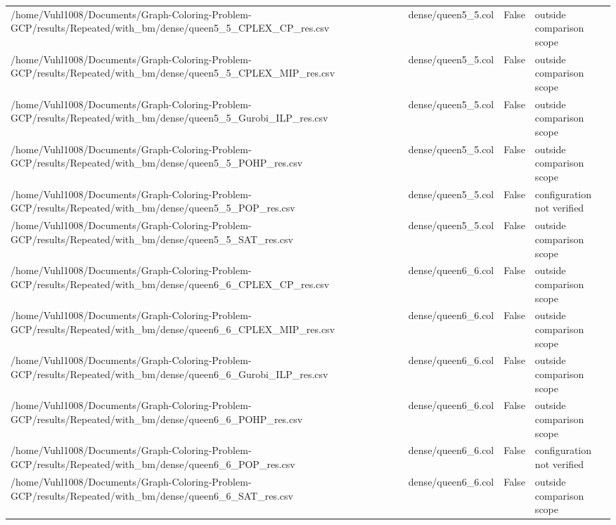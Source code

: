 \begin{table}[htbp]
\begin{tabular}{llll}
/home/Vuhl1008/Documents/Graph-Coloring-Problem-GCP/results/Repeated/with\_bm/dense/queen5\_5\_CPLEX\_CP\_res.csv & dense/queen5\_5.col & False & outside comparison scope \\
/home/Vuhl1008/Documents/Graph-Coloring-Problem-GCP/results/Repeated/with\_bm/dense/queen5\_5\_CPLEX\_MIP\_res.csv & dense/queen5\_5.col & False & outside comparison scope \\
/home/Vuhl1008/Documents/Graph-Coloring-Problem-GCP/results/Repeated/with\_bm/dense/queen5\_5\_Gurobi\_ILP\_res.csv & dense/queen5\_5.col & False & outside comparison scope \\
/home/Vuhl1008/Documents/Graph-Coloring-Problem-GCP/results/Repeated/with\_bm/dense/queen5\_5\_POHP\_res.csv & dense/queen5\_5.col & False & outside comparison scope \\
/home/Vuhl1008/Documents/Graph-Coloring-Problem-GCP/results/Repeated/with\_bm/dense/queen5\_5\_POP\_res.csv & dense/queen5\_5.col & False & configuration not verified \\
/home/Vuhl1008/Documents/Graph-Coloring-Problem-GCP/results/Repeated/with\_bm/dense/queen5\_5\_SAT\_res.csv & dense/queen5\_5.col & False & outside comparison scope \\
/home/Vuhl1008/Documents/Graph-Coloring-Problem-GCP/results/Repeated/with\_bm/dense/queen6\_6\_CPLEX\_CP\_res.csv & dense/queen6\_6.col & False & outside comparison scope \\
/home/Vuhl1008/Documents/Graph-Coloring-Problem-GCP/results/Repeated/with\_bm/dense/queen6\_6\_CPLEX\_MIP\_res.csv & dense/queen6\_6.col & False & outside comparison scope \\
/home/Vuhl1008/Documents/Graph-Coloring-Problem-GCP/results/Repeated/with\_bm/dense/queen6\_6\_Gurobi\_ILP\_res.csv & dense/queen6\_6.col & False & outside comparison scope \\
/home/Vuhl1008/Documents/Graph-Coloring-Problem-GCP/results/Repeated/with\_bm/dense/queen6\_6\_POHP\_res.csv & dense/queen6\_6.col & False & outside comparison scope \\
/home/Vuhl1008/Documents/Graph-Coloring-Problem-GCP/results/Repeated/with\_bm/dense/queen6\_6\_POP\_res.csv & dense/queen6\_6.col & False & configuration not verified \\
/home/Vuhl1008/Documents/Graph-Coloring-Problem-GCP/results/Repeated/with\_bm/dense/queen6\_6\_SAT\_res.csv & dense/queen6\_6.col & False & outside comparison scope \\
\hline
\end{tabular}
\end{table}
